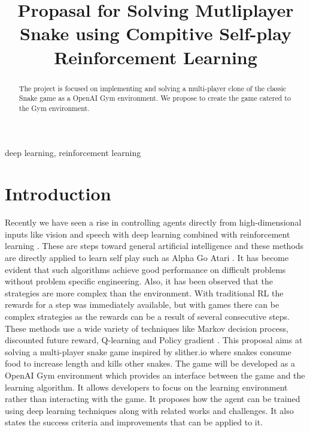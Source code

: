 \documentclass[conference]{IEEEtran}
\begin{document}
\title{Propasal for Solving Mutliplayer Snake using Compitive Self-play Reinforcement Learning}

\author{
\and
{}
\and
{}
}

\maketitle

\begin{abstract}
The project is focused on implementing and solving a multi-player clone of the classic Snake game as a OpenAI Gym \cite{sd1} environment. We propose to create the game catered to the Gym environment.
\end{abstract}

\begin{IEEEkeywords}
deep learning, reinforcement learning
\end{IEEEkeywords}

\section{Introduction}
Recently we have seen a rise in controlling agents directly from high-dimensional inputs like vision and speech with deep learning combined with reinforcement learning \cite{sd3} \cite{sd5}. These are steps toward general artificial intelligence and these methods are directly applied to learn self play such as Alpha Go \cite{sd6} Atari \cite{sd3}. It has become evident that such algorithms achieve good performance on difficult problems without problem specific engineering. Also, it has been observed that the strategies are more complex than the environment. With traditional RL the rewards for a step was immediately available, but with games there can be complex strategies as the rewards can be a result of several consecutive steps. These methods use a wide variety of techniques like Markov decision process, discounted future reward, Q-learning \cite{sd5} and Policy gradient \cite{sd4}.\break
This proposal aims at solving a multi-player snake game inspired by slither.io \cite{sd2} where snakes consume food to increase length and kills other snakes. The game will be developed as a OpenAI Gym \cite{sd2} environment which provides an interface between the game and the learning algorithm. It allows developers to focus on the learning environment rather than interacting with the game. It proposes how the agent can be trained using deep learning techniques along with related works and challenges. It also states the success criteria and improvements that can be applied to it.
\end{document}
